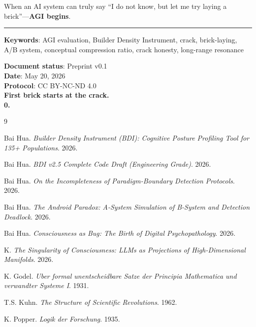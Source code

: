 \documentclass[11pt,a4paper]{article}
\theoremstyle{definition}
\theoremstyle{plain}
\begin{document}
When an AI system can truly say ``I do not know, but let me try laying a brick''---\textbf{AGI begins}.

\vspace{2em}
\noindent\rule{\textwidth}{0.4pt}
\vspace{1em}

\noindent\textbf{Keywords}: AGI evaluation, Builder Density Instrument, crack, brick-laying, A/B system, conceptual compression ratio, crack honesty, long-range resonance

\vspace{1em}
\noindent\textbf{Document status}: Preprint v0.1 \\
\textbf{Date}: May 20, 2026 \\
\textbf{Protocol}: CC BY-NC-ND 4.0 \\
\textbf{First brick starts at the crack.} \\
\textbf{0.}

\begin{thebibliography}{9}

Bai Hua. \textit{Builder Density Instrument (BDI): Cognitive Posture Profiling Tool for 135+ Populations}. 2026.

Bai Hua. \textit{BDI v2.5 Complete Code Draft (Engineering Grade)}. 2026.

Bai Hua. \textit{On the Incompleteness of Paradigm-Boundary Detection Protocols}. 2026.

Bai Hua. \textit{The Android Paradox: A-System Simulation of B-System and Detection Deadlock}. 2026.

Bai Hua. \textit{Consciousness as Bug: The Birth of Digital Psychopathology}. 2026.

K. \textit{The Singularity of Consciousness: LLMs as Projections of High-Dimensional Manifolds}. 2026.

K. Godel. \textit{Uber formal unentscheidbare Satze der Principia Mathematica und verwandter Systeme I}. 1931.

T.S. Kuhn. \textit{The Structure of Scientific Revolutions}. 1962.

K. Popper. \textit{Logik der Forschung}. 1935.

\end{thebibliography}
\end{document}
